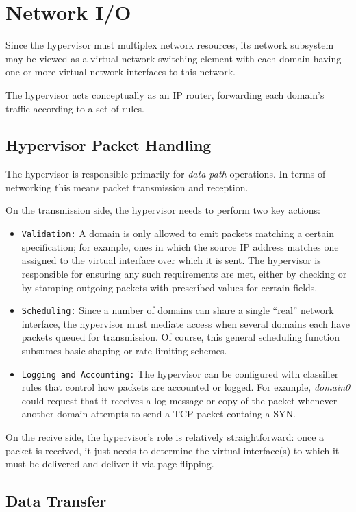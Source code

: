 \documentclass[11pt,twoside,final,openright]{xenstyle}
\begin{document}
\chapter{Network I/O}
Since the hypervisor must multiplex network resources, its network subsystem
may be viewed as a virtual network switching element with each domain having
one or more virtual network interfaces to this network.

The hypervisor acts conceptually as an IP router, forwarding each domain's
traffic according to a set of rules.

\section{Hypervisor Packet Handling}
The hypervisor is responsible primarily for {\it data-path} operations.
In terms of networking this means packet transmission and reception.

On the transmission side, the hypervisor needs to perform two key actions:
\begin{itemize}
\item {\tt Validation:} A domain is only allowed to emit packets matching a certain
specification; for example, ones in which the source IP address matches
one assigned to the virtual interface over which it is sent. The hypervisor
is responsible for ensuring any such requirements are met, either by checking
or by stamping outgoing packets with prescribed values for certain fields.

\item {\tt Scheduling:} Since a number of domains can share a single ``real'' network 
interface, the hypervisor must mediate access when several domains each 
have packets queued for transmission. Of course, this general scheduling
function subsumes basic shaping or rate-limiting schemes.

\item {\tt Logging and Accounting:} The hypervisor can be configured with classifier 
rules that control how packets are accounted or logged. For example, 
{\it domain0} could request that it receives a log message or copy of the
packet whenever another domain attempts to send a TCP packet containg a 
SYN.
\end{itemize}
On the recive side, the hypervisor's role is relatively straightforward:
once a packet is received, it just needs to determine the virtual interface(s)
to which it must be delivered and deliver it via page-flipping. 


\section{Data Transfer}
\end{document}
